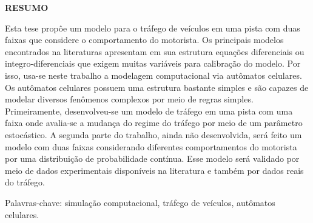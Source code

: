 \newpage
\singlespacing\thispagestyle{empty}
\begin{center}
{\bf RESUMO}
\end{center}

Esta tese propôe um modelo para o tráfego de veículos em uma pista com duas faixas que considere o comportamento do motorista. Os principais modelos encontrados na literaturas apresentam em sua estrutura equações diferenciais ou integro-diferenciais que exigem muitas variáveis para calibração do modelo. Por isso, usa-se neste trabalho a modelagem computacional via autômatos celulares. Os autômatos celulares possuem uma estrutura bastante simples e são capazes de modelar diversos fenômenos complexos por meio de regras simples. Primeiramente, desenvolveu-se um modelo de tráfego em uma pista com uma faixa onde avalia-se a mudança do regime do tráfego por meio de um parâmetro estocástico. A segunda parte do trabalho, ainda não desenvolvida, será feito um modelo com duas faixas considerando diferentes comportamentos do motorista por uma distribuição de probabilidade contínua. Esse modelo será validado por meio de dados experimentais disponíveis na literatura e também por dados reais do tráfego.


\vspace{1.5cm}
\noindent Palavras-chave: simulação computacional, tráfego de veículos, autômatos celulares.
